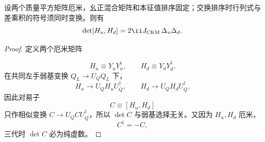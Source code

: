 \begin{proposition}
设两个质量平方矩阵厄米，幺正混合矩阵和本征值排序固定；交换排序时行列式与差乘积的符号须同时变换。则有
\begin{equation}
 {\det[H_u,H_d]=2\ii J_{\rm CKM}\,\Delta_u\Delta_d.}
\label{eq:jarlskog-determinant-dp11}
\end{equation}
\end{proposition}
\begin{proof}
定义两个厄米矩阵

\begin{equation*}
 H_u\equiv Y_uY_u^\dagger,
 \qquad
 H_d\equiv Y_dY_d^\dagger.
\end{equation*}
在共同左手弱基变换 $Q_L\to U_QQ_L$ 下，
\begin{equation*}
 H_u\to U_QH_uU_Q^\dagger,
 \qquad
 H_d\to U_QH_dU_Q^\dagger.
\end{equation*}
因此对易子
\begin{equation*}
 C\equiv[H_u,H_d]
\end{equation*}
只作相似变换 $C\to U_QCU_Q^\dagger$，所以 $\det C$ 与弱基选择无关。又因为 $H_u,H_d$ 厄米，
\begin{equation*}
 C^\dagger=-C,
\end{equation*}
三代时 $\det C$ 必为纯虚数。


\end{proof}
